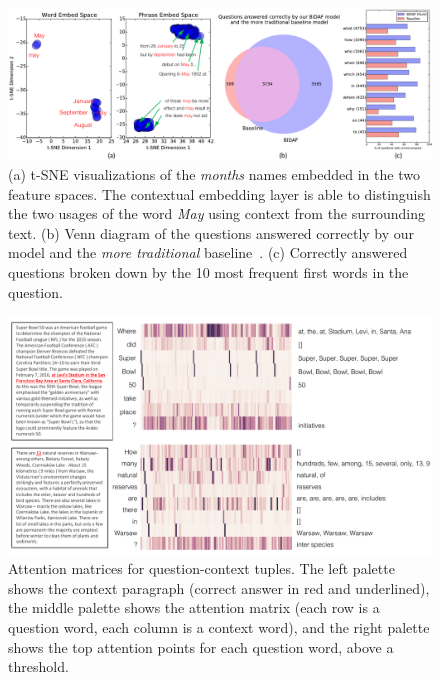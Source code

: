 \begin{figure}[t]
\centering
\includegraphics[width=34pc]{figures/subfigure}
\caption{\small (a) t-SNE visualizations of the \textit{months} names embedded in the two feature spaces. The contextual embedding layer is able to distinguish the two usages of the word \textit{May} using context from the surrounding text. (b) Venn diagram of the questions answered correctly by our model and the \textit{more traditional} baseline~\citep{rajpurkar2016squad}. (c) Correctly answered questions broken down by the 10 most frequent first words in the question.}
\label{fig:tsne}
\end{figure}

\begin{figure}[]
\centering
\includegraphics[width=30pc]{figures/attention_weights_viz_2}
\caption{\small Attention matrices for question-context tuples. The left palette shows the context paragraph (correct answer in red and underlined), the middle palette shows the attention matrix (each row is a question word, each column is a context word), and the right palette shows the top attention points for each question word, above a threshold.}
\label{fig:viz_attention}
\end{figure}

